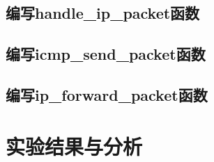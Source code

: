 \documentclass{zjureport}
\begin{document}
  \subsection{编写handle\_ip\_packet函数}
    

  \newpage
  \subsection{编写icmp\_send\_packet函数}
    

  \subsection{编写ip\_forward\_packet函数}
    



  \newpage
  \section{实验结果与分析}
\end{document}
